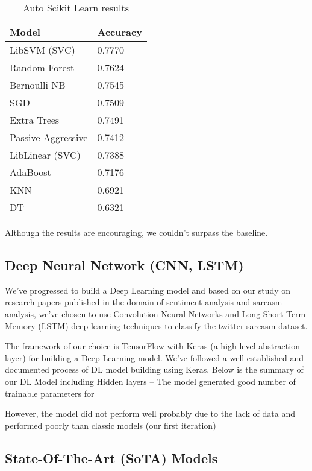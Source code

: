 \documentclass[conference]{IEEEtran}
\begin{document}
\begin{table}[htbp]
	\caption{Auto Scikit Learn results}
	\begin{center}
		\begin{tabular}{|l|l|}
			\hline
			\textbf{Model} & \textbf{Accuracy}\\ \hline
			LibSVM (SVC) & 0.7770 \\ \hline
			Random Forest & 0.7624 \\ \hline
			Bernoulli NB & 0.7545 \\ \hline
			SGD & 0.7509 \\ \hline
			Extra Trees & 0.7491 \\ \hline
			Passive Aggressive & 0.7412 \\ \hline
			LibLinear (SVC) & 0.7388 \\ \hline
			AdaBoost & 0.7176 \\ \hline
			KNN & 0.6921 \\ \hline
			DT & 0.6321 \\ \hline								
		\end{tabular}
		\label{tab2}
	\end{center}
\end{table}


Although the results are encouraging, we couldn’t surpass the baseline.

\subsection{Deep Neural Network (CNN, LSTM)}

We’ve progressed to build a Deep Learning model and based on our study on research papers published in the domain of sentiment analysis and sarcasm analysis, we’ve chosen to use Convolution Neural Networks and Long Short-Term Memory (LSTM) deep learning techniques to classify the twitter sarcasm dataset.

The framework of our choice is TensorFlow with Keras (a high-level abstraction layer) for building a Deep Learning model. We’ve followed a well established and documented process of DL model building using Keras. Below is the summary of our DL Model including Hidden layers – The model generated good number of trainable parameters for 

However, the model did not perform well probably due to the lack of data and performed poorly than classic models (our first iteration)

\subsection{State-Of-The-Art (SoTA) Models}
\end{document}
